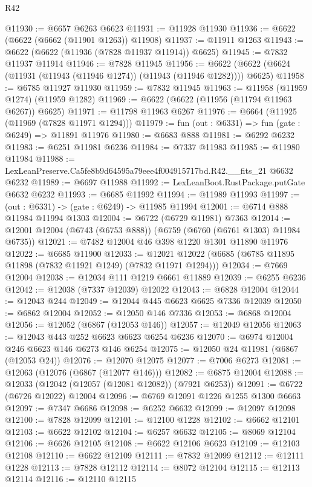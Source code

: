\begin{lexlean}{R42}
\begin{coremodule}
{@11930 := @6657 @6263 @6623
@11931 := @11928 @11930
@11936 := @6622 (@6622 (@6662 (@11901 @1263)) @11908)
@11937 := @11911 @1263
@11943 := @6622 (@6622 (@11936 (@7828 @11937 @11914)) @6625)
@11945 := @7832 @11937 @11914
@11946 := @7828 @11945
@11956 := @6622 (@6622 (@6624 (@11931 (@11943 (@11946 @1274)) (@11943 (@11946 @1282)))) @6625)
@11958 := @6785 @11927 @11930
@11959 := @7832 @11945
@11963 := @11958 (@11959 @1274) (@11959 @1282)
@11969 := @6622 (@6622 (@11956 (@11794 @11963 @6267)) @6625)
@11971 := @11798 @11963 @6267
@11976 := @6664 (@11925 (@11969 (@7828 @11971 @1294)))
@11979 := fun (out : @6331) => fun (gate : @6249) => @11891 @11976
@11980 := @6683 @888
@11981 := @6292 @6232
@11983 := @6251 @11981 @6236
@11984 := @7337 @11983
@11985 := @11980 @11984
@11988 := LexLeanPreserve.Ca5fe8b9d64595a79eee4f004915717bd.R42.__fits_21 @6632 @6232
@11989 := @6697 @11988
@11992 := LexLeanBoot.RustPackage.putGate @6632 @6232
@11993 := @6685 @11992
@11994 := @11989 @11993
@11997 := (out : @6331) -> (gate : @6249) -> @11985 @11994
@12001 := @6714 @888 @11984 @11994 @1303
@12004 := @6722 (@6729 @11981) @7363
@12014 := @12001 @12004 (@6743 (@6753 @888)) (@6759 (@6760 (@6761 @1303) @11984 @6735))
@12021 := @7482 @12004 @46 @398 @1220 @1301 @11890 @11976
@12022 := @6685 @11900
@12033 := @12021 @12022 (@6685 (@6785 @11895 @11898 (@7832 @11921 @1249) (@7832 @11971 @1294)))
@12034 := @7669 @12004
@12038 := @12034 @111 @1219 @6661 @11889
@12039 := @6255 @6236
@12042 := @12038 (@7337 @12039) @12022
@12043 := @6828 @12004
@12044 := @12043 @244
@12049 := @12044 @445 @6623 @6625 @7336 @12039
@12050 := @6862 @12004
@12052 := @12050 @146 @7336
@12053 := @6868 @12004
@12056 := @12052 (@6867 (@12053 @146))
@12057 := @12049 @12056
@12063 := @12043 @443 @252 @6623 @6623 @6254 @6236
@12070 := @6974 @12004 @246 @6623 @146 @6273 @146 @6254
@12075 := @12050 @24 @11981 (@6867 (@12053 @24))
@12076 := @12070 @12075
@12077 := @7006 @6273
@12081 := @12063 (@12076 (@6867 (@12077 @146)))
@12082 := @6875 @12004
@12088 := @12033 (@12042 (@12057 (@12081 @12082)) (@7921 @6253))
@12091 := @6722 (@6726 @12022) @12004
@12096 := @6769 @12091 @1226 @1255 @1300 @6663
@12097 := @7347 @6686
@12098 := @6252 @6632
@12099 := @12097 @12098
@12100 := @7828 @12099
@12101 := @12100 @1228
@12102 := @6662 @12101
@12103 := @6622 @12102
@12104 := @6257 @6632
@12105 := @8069 @12104
@12106 := @6626 @12105
@12108 := @6622 @12106 @6623
@12109 := @12103 @12108
@12110 := @6622 @12109
@12111 := @7832 @12099
@12112 := @12111 @1228
@12113 := @7828 @12112
@12114 := @8072 @12104
@12115 := @12113 @12114
@12116 := @12110 @12115
}
\end{coremodule}
\end{lexlean}
